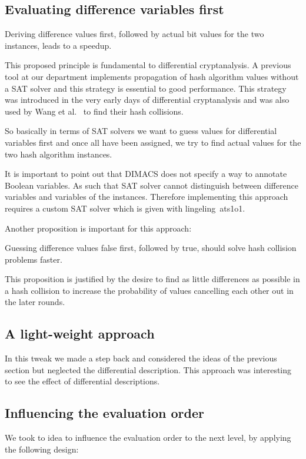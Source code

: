 \newpage
\subsection{Evaluating difference variables first}
\label{sec:enc-diff-desc-ocnf}
%
\begin{prop}
  Deriving difference values first, followed by actual bit values for the two instances,
  leads to a speedup.
\end{prop}

This proposed principle is fundamental to differential cryptanalysis. A previous tool
at our department implements propagation of hash algorithm values without a SAT solver
and this strategy is essential to good performance. This strategy was introduced
in the very early days of differential cryptanalysis and was also used by Wang et
al.~\cite{wang2004} to find their hash collisions.

So basically in terms of SAT solvers we want to guess values for differential variables
first and once all have been assigned, we try to find actual values for the two
hash algorithm instances.

It is important to point out that DIMACS does not specify a way to annotate Boolean
variables. As such that SAT solver cannot distinguish between difference variables
and variables of the instances. Therefore implementing this approach requires a custom
SAT solver which is given with lingeling~ats1o1.

Another proposition is important for this approach:

\begin{prop}
  Guessing difference values false first, followed by true,
  should solve hash collision problems faster.
\end{prop}

This proposition is justified by the desire to find as little differences as possible
in a hash collision to increase the probability of values cancelling each other out
in the later rounds.

\subsection{A light-weight approach}
\label{sec:enc-ocnf}
%
In this tweak we made a step back and considered the ideas of the previous
section but neglected the differential description. This approach was interesting
to see the effect of differential descriptions.

\subsection{Influencing the evaluation order}
\label{sec:enc-diff-desc-eo}
%
We took to idea to influence the evaluation order to the next level,
by applying the following design:

